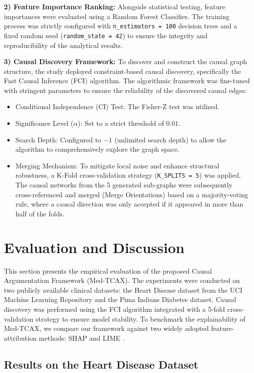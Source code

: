 \documentclass[conference, a4paper]{IEEEtran}
\begin{document}
\textbf{2) Feature Importance Ranking:} 
Alongside statistical testing, feature importances were evaluated using a Random Forest Classifier. The training process was strictly configured with \texttt{n\_estimators = 100} decision trees and a fixed random seed (\texttt{random\_state = 42}) to ensure the integrity and reproducibility of the analytical results.

\textbf{3) Causal Discovery Framework:} 
To discover and construct the causal graph structure, the study deployed constraint-based causal discovery, specifically the Fast Causal Inference (FCI) algorithm. The algorithmic framework was fine-tuned with stringent parameters to ensure the reliability of the discovered causal edges:
\begin{itemize}
    \item Conditional Independence (CI) Test: The Fisher-Z test was utilized.
    \item Significance Level ($\alpha$): Set to a strict threshold of $0.01$.
    \item Search Depth: Configured to $-1$ (unlimited search depth) to allow the algorithm to comprehensively explore the graph space.
    \item Merging Mechanism: To mitigate local noise and enhance structural robustness, a K-Fold cross-validation strategy (\texttt{K\_SPLITS = 5}) was applied. The causal networks from the 5 generated sub-graphs were subsequently cross-referenced and merged (Merge Orientations) based on a majority-voting rule, where a causal direction was only accepted if it appeared in more than half of the folds.
\end{itemize}
\section{Evaluation and Discussion}

This section presents the empirical evaluation of the proposed Causal Argumentation Framework (Med-TCAX). The experiments were conducted on two publicly available clinical datasets: the Heart Disease dataset from the UCI Machine Learning Repository and the Pima Indians Diabetes dataset. Causal discovery was performed using the FCI algorithm integrated with a 5-fold cross-validation strategy to ensure model stability. To benchmark the explainability of Med-TCAX, we compare our framework against two widely adopted feature-attribution methods: SHAP \cite{ref3} and LIME \cite{ref4}.

\subsection{Results on the Heart Disease Dataset}
\end{document}
